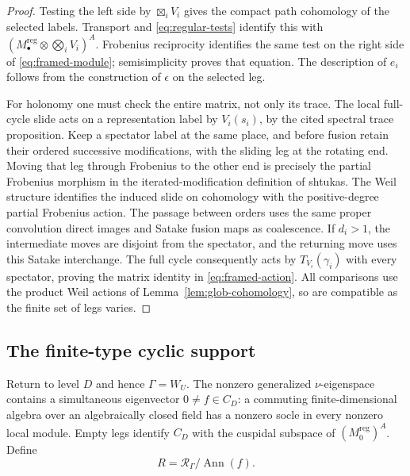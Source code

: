 \documentclass[11pt]{article}
\numberwithin{equation}{section}
\theoremstyle{definition}
\theoremstyle{remark}
\begin{document}
\begin{proof}
Testing the left side by $\boxtimes_i V_i$ gives the compact path
cohomology of the selected labels.  Transport and
\eqref{eq:regular-tests} identify this with
$(M_\bullet^{\mathrm{reg}}\otimes\bigotimes_i V_i)^A$.
Frobenius reciprocity identifies the same test on the right side of
\eqref{eq:framed-module}; semisimplicity proves that equation.
The description of $e_i$ follows from the construction of
$\epsilon$ on the selected leg.

For holonomy one must check the entire matrix, not only its trace.
The local full-cycle slide acts on a representation label by $V_i(s_i)$,
by the cited spectral trace proposition.  Keep a spectator label at
the same place, and before fusion retain their ordered successive
modifications, with the sliding leg at the rotating end.  Moving that
leg through Frobenius to the other end is precisely the partial
Frobenius morphism in the iterated-modification definition of shtukas.
The Weil structure identifies the induced slide on cohomology with
the positive-degree partial Frobenius action.  The passage between
orders uses the same proper convolution direct images and Satake
fusion maps as coalescence.  If $d_i>1$, the intermediate moves are
disjoint from the spectator, and the returning move uses this Satake
interchange.  The full cycle consequently acts by $T_{V_i}(\gamma_i)$
with every spectator, proving the matrix identity in
\eqref{eq:framed-action}.  All comparisons use the product Weil
actions of Lemma~\ref{lem:glob-cohomology}, so are compatible as the
finite set of legs varies.
\end{proof}

\subsection{The finite-type cyclic support}

Return to level $D$ and hence $\Gamma=W_U$.  The nonzero generalized
$\nu$-eigenspace contains a simultaneous eigenvector
$0\ne f\in C_D$: a commuting finite-dimensional algebra over an
algebraically closed field has a nonzero socle in every nonzero local
module.  Empty legs identify $C_D$ with the cuspidal subspace of
$(M_0^{\mathrm{reg}})^A$.  Define
\[
                 R=\mathscr R_\Gamma/\operatorname{Ann}(f).
\]
\end{document}
